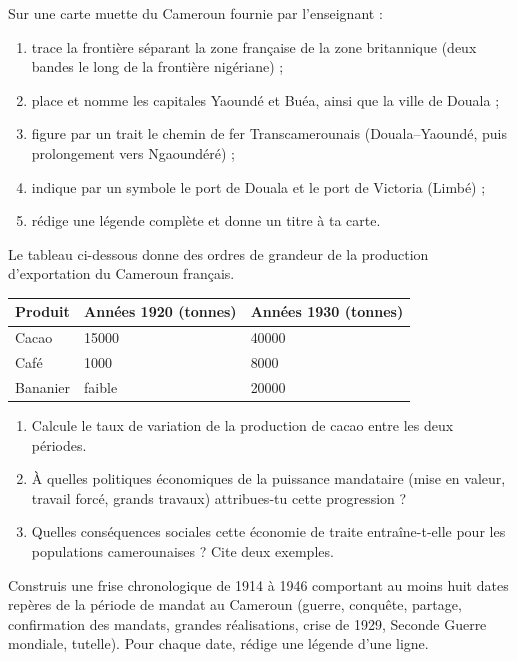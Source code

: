 \documentclass[11pt]{article}
\begin{document}
\begin{exercice}
Sur une carte muette du Cameroun fournie par l'enseignant :
\begin{enumerate}
\item trace la frontière séparant la zone française de la zone britannique (deux bandes le long de la frontière nigériane) ;
\item place et nomme les capitales Yaoundé et Buéa, ainsi que la ville de Douala ;
\item figure par un trait le chemin de fer Transcamerounais (Douala--Yaoundé, puis prolongement vers Ngaoundéré) ;
\item indique par un symbole le port de Douala et le port de Victoria (Limbé) ;
\item rédige une légende complète et donne un titre à ta carte.
\end{enumerate}
\end{exercice}

\begin{exercice}
Le tableau ci-dessous donne des ordres de grandeur de la production d'exportation du Cameroun français.
\begin{center}
\begin{tabularx}{\linewidth}{|l|X|X|}\hline
\rowcolor{popblueL} Produit & Années 1920 (tonnes) & Années 1930 (tonnes) \\ \hline
Cacao & \num{15000} & \num{40000} \\ \hline
Café & \num{1000} & \num{8000} \\ \hline
Bananier & faible & \num{20000} \\ \hline
\end{tabularx}
\end{center}
\begin{enumerate}
\item Calcule le taux de variation de la production de cacao entre les deux périodes.
\item À quelles politiques économiques de la puissance mandataire (mise en valeur, travail forcé, grands travaux) attribues-tu cette progression ?
\item Quelles conséquences sociales cette économie de traite entraîne-t-elle pour les populations camerounaises ? Cite deux exemples.
\end{enumerate}
\end{exercice}

\begin{exercice}
Construis une frise chronologique de 1914 à 1946 comportant au moins huit dates repères de la période de mandat au Cameroun (guerre, conquête, partage, confirmation des mandats, grandes réalisations, crise de 1929, Seconde Guerre mondiale, tutelle). Pour chaque date, rédige une légende d'une ligne.
\end{exercice}
\end{document}
